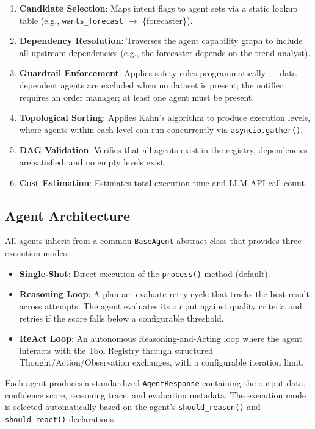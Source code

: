 \documentclass[conference]{IEEEtran}
\begin{document}
\begin{enumerate}
    \item \textbf{Candidate Selection}: Maps intent flags to agent sets via a static lookup table (e.g., \texttt{wants\_forecast} $\rightarrow$ \{forecaster\}).
    \item \textbf{Dependency Resolution}: Traverses the agent capability graph to include all upstream dependencies (e.g., the forecaster depends on the trend analyst).
    \item \textbf{Guardrail Enforcement}: Applies safety rules programmatically --- data-dependent agents are excluded when no dataset is present; the notifier requires an order manager; at least one agent must be present.
    \item \textbf{Topological Sorting}: Applies Kahn's algorithm to produce execution levels, where agents within each level can run concurrently via \texttt{asyncio.gather()}.
    \item \textbf{DAG Validation}: Verifies that all agents exist in the registry, dependencies are satisfied, and no empty levels exist.
    \item \textbf{Cost Estimation}: Estimates total execution time and LLM API call count.
\end{enumerate}

\subsection{Agent Architecture}

All agents inherit from a common \texttt{BaseAgent} abstract class that provides three execution modes:

\begin{itemize}
    \item \textbf{Single-Shot}: Direct execution of the \texttt{process()} method (default).
    \item \textbf{Reasoning Loop}: A plan-act-evaluate-retry cycle that tracks the best result across attempts. The agent evaluates its output against quality criteria and retries if the score falls below a configurable threshold.
    \item \textbf{ReAct Loop}: An autonomous Reasoning-and-Acting loop where the agent interacts with the Tool Registry through structured Thought/Action/Observation exchanges, with a configurable iteration limit.
\end{itemize}

Each agent produces a standardized \texttt{AgentResponse} containing the output data, confidence score, reasoning trace, and evaluation metadata. The execution mode is selected automatically based on the agent's \texttt{should\_reason()} and \texttt{should\_react()} declarations.
\end{document}
